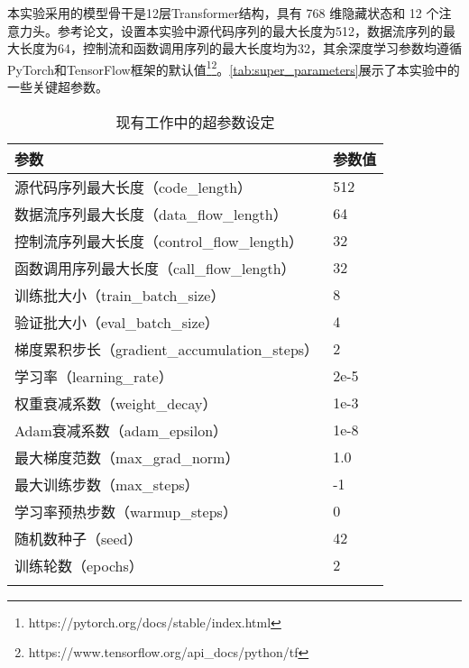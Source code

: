 本实验采用的模型骨干是12层Transformer结构，具有 768 维隐藏状态和 12 个注意力头。参考论文\cite{guo2020graphcodebert}，设置本实验中源代码序列的最大长度为512，数据流序列的最大长度为64，控制流和函数调用序列的最大长度均为32，其余深度学习参数均遵循PyTorch和TensorFlow框架的默认值\footnote{https://pytorch.org/docs/stable/index.html}\footnote{https://www.tensorflow.org/api\_docs/python/tf}。\autoref{tab:super_parameters}展示了本实验中的一些关键超参数。
\begin{table}[htbp]
    \caption{\label{tab:super_parameters}现有工作中的超参数设定}
    \small
    \renewcommand{\arraystretch}{1.5}
    \begin{tabularx}{\linewidth}{p{8cm}<{\centering}X<{\centering}}
        \Xhline{2\arrayrulewidth}
        参数                            & 参数值  \\ \hline
        源代码序列最大长度（code\_length）                  & 512  \\
        数据流序列最大长度（data\_flow\_length）            & 64   \\
        控制流序列最大长度（control\_flow\_length）            & 32   \\
        函数调用序列最大长度（call\_flow\_length）            & 32   \\
        训练批大小（train\_batch\_size）            & 8    \\
        验证批大小（eval\_batch\_size）             & 4    \\
        梯度累积步长（gradient\_accumulation\_steps） & 2    \\
        学习率（learning\_rate）                & 2e-5 \\
        权重衰减系数（weight\_decay）                 & 1e-3  \\
        Adam衰减系数（adam\_epsilon）                 & 1e-8 \\
        最大梯度范数（max\_grad\_norm）               & 1.0  \\
        最大训练步数（max\_steps）                    & -1   \\
        学习率预热步数（warmup\_steps）                 & 0    \\
        随机数种子（seed）                          & 42   \\
        训练轮数（epochs）                        & 2    \\ \Xhline{2\arrayrulewidth}
        \end{tabularx}
\end{table}



